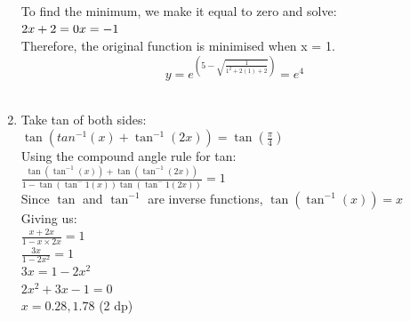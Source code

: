 \documentclass[../main.tex]{subfiles}
\begin{document}
\begin{enumerate}
    To find the minimum, we make it equal to zero and solve:\\
    \(2x+2=0\\
    x=-1\)\\
    
    Therefore, the original function is minimised when x = 1.\\
    \[y=e^{(5-\sqrt{\frac{1}{1^2+2(1)+2}})}=e^4\]\\

    \item 
    Take tan of both sides:\\
    \(\tan(tan^{-1}(x)+\tan^{-1}(2x))=\tan(\frac{\pi}{4})\)\\

    Using the compound angle rule for tan:\\
    
    \(\frac{\tan(\tan^{-1}(x))+\tan(\tan^{-1}(2x))}{1-\tan(\tan^-1(x))\tan(\tan^-1(2x))}=1\)\\

    Since \(\tan\) and \(\tan^{-1}\) are inverse functions, \(\tan(\tan^{-1}(x))=x\)\\

    Giving us:\\
    \(\frac{x+2x}{1-x\times 2x}=1\)\\

    \(\frac{3x}{1-2x^2}=1\)\\

    \(3x=1-2x^2\)\\

    \(2x^2+3x-1=0\)\\

    \(x=0.28, 1.78\) (2 dp)
    
    
\end{enumerate}
\end{document}
